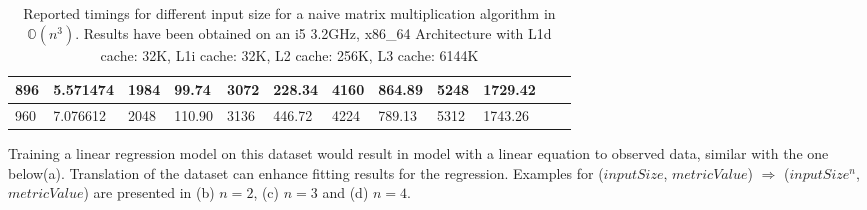 \begin{table}[H]
\begin{center}
{\begin{tabular}{|l|l|l|l|l|l|l|l|l|l|l|l|}
896                                                  & 5.571474 & 1984                                                 & 99.74  & 3072                                                 & 228.34 & 4160                                                 & 864.89 & 5248                                                 & 1729.42 &                                                      &         \\ \hline
960                                                  & 7.076612 & 2048                                                 & 110.90 & 3136                                                 & 446.72 & 4224                                                 & 789.13 & 5312                                                 & 1743.26 &                                                      &         \\ \hline
\end{tabular}
}
\end{center}
\caption{Reported timings for different input size for a naive matrix multiplication algorithm in $\mathbb{O}(n^{3})$. Results have been obtained on an i5 3.2GHz, x86\_64 Architecture with L1d cache: 32K, L1i cache: 32K, L2 cache: 256K, L3 cache:  6144K}
\end{table}

Training a linear regression model on this dataset would result in model with a linear equation to observed data, similar with the one below(a). Translation of the dataset can enhance fitting results for the regression. Examples for ($inputSize$, $metricValue$) $ \Rightarrow $ ($inputSize^{n}$, $metricValue$) are presented in (b) $n = 2$, (c) $n = 3$ and (d) $n = 4$.



